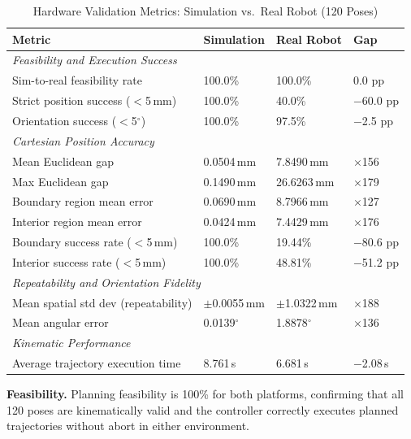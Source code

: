\documentclass[conference]{IEEEtran}
\begin{document}
	\begin{table}[t]
		\centering
		\caption{Hardware Validation Metrics: Simulation vs.\ Real Robot (120 Poses)}
		\label{tab:hw_comparison}
		\renewcommand{\arraystretch}{1.3}
		\small
		\begin{tabular}{llll}
			\toprule
			\textbf{Metric} & \textbf{Simulation} & \textbf{Real Robot} & \textbf{Gap} \\
			\midrule
			\multicolumn{4}{l}{\textit{Feasibility and Execution Success}} \\
			Sim-to-real feasibility rate        & 100.0\%  & 100.0\%  & 0.0 pp \\
			Strict position success ($<$5\,mm)  & 100.0\%  &  40.0\%  & $-$60.0 pp \\
			Orientation success ($<$5$^\circ$)  & 100.0\%  &  97.5\%  & $-$2.5 pp \\
			\midrule
			\multicolumn{4}{l}{\textit{Cartesian Position Accuracy}} \\
			Mean Euclidean gap                  & 0.0504\,mm  & 7.8490\,mm  & $\times$156 \\
			Max Euclidean gap                   & 0.1490\,mm  & 26.6263\,mm & $\times$179 \\
			Boundary region mean error          & 0.0690\,mm  & 8.7966\,mm  & $\times$127 \\
			Interior region mean error          & 0.0424\,mm  & 7.4429\,mm  & $\times$176 \\
			Boundary success rate ($<$5\,mm)    & 100.0\%     & 19.44\%     & $-$80.6 pp  \\
			Interior success rate ($<$5\,mm)    & 100.0\%     & 48.81\%     & $-$51.2 pp  \\
			\midrule
			\multicolumn{4}{l}{\textit{Repeatability and Orientation Fidelity}} \\
			Mean spatial std dev (repeatability) & $\pm$0.0055\,mm & $\pm$1.0322\,mm & $\times$188 \\
			Mean angular error                   & 0.0139$^\circ$  & 1.8878$^\circ$  & $\times$136 \\
			\midrule
			\multicolumn{4}{l}{\textit{Kinematic Performance}} \\
			Average trajectory execution time    & 8.761\,s & 6.681\,s & $-$2.08\,s \\
			\bottomrule
		\end{tabular}
	\end{table}
	
	\textbf{Feasibility.} Planning feasibility is 100\% for both
	platforms, confirming that all 120 poses are kinematically
	valid and the controller correctly executes planned trajectories
	without abort in either environment.
	
\end{document}
